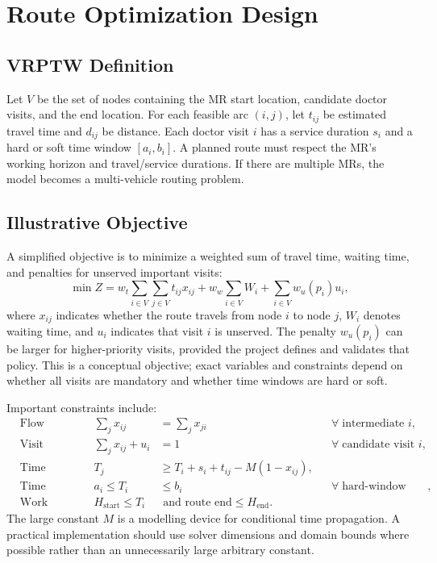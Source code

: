 \documentclass[12pt,a4paper,oneside]{report}
\begin{document}
\section{Route Optimization Design}
\subsection{VRPTW Definition}
Let $V$ be the set of nodes containing the MR start location, candidate doctor visits, and the end location. For each feasible arc $(i,j)$, let $t_{ij}$ be estimated travel time and $d_{ij}$ be distance. Each doctor visit $i$ has a service duration $s_i$ and a hard or soft time window $[a_i,b_i]$. A planned route must respect the MR's working horizon and travel/service durations. If there are multiple MRs, the model becomes a multi-vehicle routing problem.

\subsection{Illustrative Objective}
A simplified objective is to minimize a weighted sum of travel time, waiting time, and penalties for unserved important visits:
\begin{equation}
\min Z = w_t\sum_{i\in V}\sum_{j\in V} t_{ij}x_{ij} + w_w\sum_{i\in V} W_i + \sum_{i\in V} w_u(p_i)u_i,
\label{eq:objective}
\end{equation}
where $x_{ij}$ indicates whether the route travels from node $i$ to node $j$, $W_i$ denotes waiting time, and $u_i$ indicates that visit $i$ is unserved. The penalty $w_u(p_i)$ can be larger for higher-priority visits, provided the project defines and validates that policy. This is a conceptual objective; exact variables and constraints depend on whether all visits are mandatory and whether time windows are hard or soft.

Important constraints include:
\begin{align}
&\text{Flow conservation:} & \sum_j x_{ij} &= \sum_j x_{ji} && \forall\; \text{intermediate } i,\\
&\text{Visit coverage:} & \sum_j x_{ij} + u_i &= 1 && \forall\; \text{candidate visit } i,\\
&\text{Time propagation:} & T_j &\geq T_i+s_i+t_{ij}-M(1-x_{ij}),\\
&\text{Time windows:} & a_i \leq T_i &\leq b_i && \forall\; \text{hard-window visits},\\
&\text{Work horizon:} & H_{\text{start}} \leq T_i &\text{ and route end} \leq H_{\text{end}}.
\end{align}
The large constant $M$ is a modelling device for conditional time propagation. A practical implementation should use solver dimensions and domain bounds where possible rather than an unnecessarily large arbitrary constant.
\end{document}
